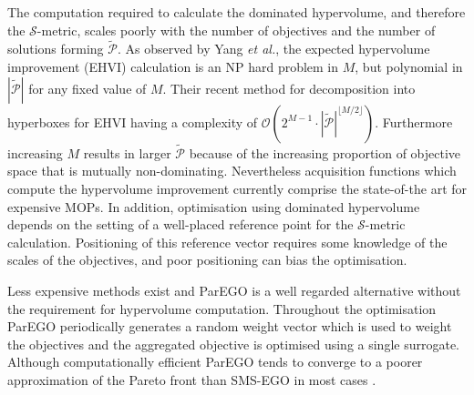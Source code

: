 \documentclass[conference]{IEEEtran}
\makeatletter
\newcommand{\nobj}{M}
\newcommand\hpv{dominated hypervolume\xspace}
\newcommand\smsego{SMS-EGO\xspace}
\newcommand\parego{ParEGO\xspace}
\newcommand\Papprox{\tilde{\mathcal{P}}}
\newcommand{\mnotejf}[2][\textcolor{blue}{\dagger}]{$#1$\marginpar{\color{blue}\raggedright\tiny$#1$ #2}}
\newcommand*{\etal}{\textit{et al.}\@\xspace}
\makeatother
\begin{document}
The computation required to calculate the \hpv, and therefore the $\mathcal{S}$-metric, scales poorly with the number of objectives and the number of solutions forming $\Papprox$. As observed by Yang \etal \cite{yangetal2019}, the expected hypervolume improvement (EHVI) calculation is an NP hard problem in $\nobj$, but polynomial in $|\Papprox|$ for any fixed value of $\nobj$. Their recent method for decomposition into hyperboxes for EHVI having a complexity of $\mathcal{O}(2^{\nobj-1}\cdot |\Papprox|^{\lfloor \nobj/2 \rfloor})$.  %
Furthermore increasing $M$ results in larger $\Papprox$ because of the increasing proportion of objective space that is mutually non-dominating. 
 Nevertheless acquisition functions which compute the hypervolume improvement currently comprise the state-of-the art for expensive MOPs. In addition, optimisation using \hpv depends on the setting of a well-placed reference point for the $\mathcal{S}$-metric calculation. Positioning of this reference vector requires some knowledge of the scales of the objectives, and poor positioning can bias the optimisation. 

Less expensive methods exist and \parego \cite{knowles2006parego} is a well regarded alternative without the requirement for hypervolume computation. Throughout the optimisation \parego periodically generates a random weight vector which is used to weight the objectives and  the aggregated objective is optimised using a single surrogate. Although computationally efficient \parego tends to converge to a poorer approximation of the Pareto front than \smsego in most cases \cite{ponweiser2008multiobjective}.
\end{document}
